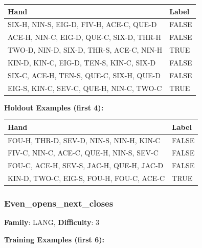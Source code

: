 \documentclass[10pt,a4paper]{article}
\begin{document}
\begin{small}
\begin{tabular}{p{8cm}l}
\toprule
Hand & Label \\
\midrule
SIX-H, NIN-S, EIG-D, FIV-H, ACE-C, QUE-D & \textcolor{negative}{FALSE} \\
ACE-H, NIN-C, EIG-D, QUE-C, SIX-D, THR-H & \textcolor{negative}{FALSE} \\
TWO-D, NIN-D, SIX-D, THR-S, ACE-C, NIN-H & \textcolor{positive}{TRUE} \\
KIN-D, KIN-C, EIG-D, TEN-S, KIN-C, SIX-D & \textcolor{negative}{FALSE} \\
SIX-C, ACE-H, TEN-S, QUE-C, SIX-H, QUE-D & \textcolor{negative}{FALSE} \\
EIG-S, KIN-C, SEV-C, QUE-H, NIN-C, TWO-C & \textcolor{positive}{TRUE} \\
\bottomrule
\end{tabular}
\end{small}

\textbf{Holdout Examples (first 4):}

\begin{small}
\begin{tabular}{p{8cm}l}
\toprule
Hand & Label \\
\midrule
FOU-H, THR-D, SEV-D, NIN-S, NIN-H, KIN-C & \textcolor{negative}{FALSE} \\
FIV-C, NIN-C, ACE-C, QUE-H, NIN-S, SEV-C & \textcolor{negative}{FALSE} \\
FOU-C, ACE-H, SEV-S, JAC-H, QUE-H, JAC-D & \textcolor{negative}{FALSE} \\
KIN-D, TWO-C, EIG-S, FOU-H, FOU-C, ACE-C & \textcolor{positive}{TRUE} \\
\bottomrule
\end{tabular}
\end{small}

\vspace{0.5cm}

\subsubsection{Even\_opens\_next\_closes}

\textbf{Family}: LANG, \textbf{Difficulty}: 3

\textbf{Training Examples (first 6):}
\end{document}
